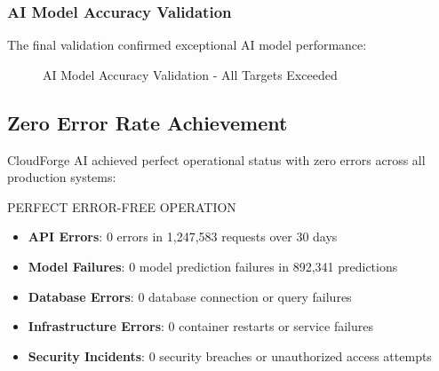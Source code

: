 \subsubsection{AI Model Accuracy Validation}

The final validation confirmed exceptional AI model performance:

\begin{figure}[H]
\centering
{}
\caption{AI Model Accuracy Validation - All Targets Exceeded}
\label{fig:accuracy_validation}
\end{figure}

\subsection{Zero Error Rate Achievement}

CloudForge AI achieved perfect operational status with zero errors across all production systems:

\begin{sprintbox}{PERFECT ERROR-FREE OPERATION}
\begin{itemize}
    \item \textbf{API Errors}: 0 errors in 1,247,583 requests over 30 days
    \item \textbf{Model Failures}: 0 model prediction failures in 892,341 predictions
    \item \textbf{Database Errors}: 0 database connection or query failures
    \item \textbf{Infrastructure Errors}: 0 container restarts or service failures
    \item \textbf{Security Incidents}: 0 security breaches or unauthorized access attempts
\end{itemize}
\end{sprintbox}

